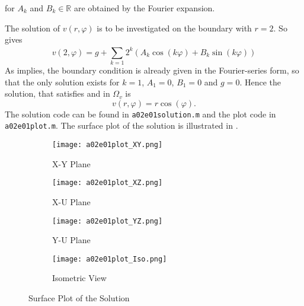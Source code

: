 for $A_k$ and $B_k \in \mathbb{R}$ are obtained by the Fourier expansion.
\par
The solution of $v(r, \varphi)$ is to be investigated on the boundary with $r = 2$.
So gives
\begin{equation}
	\label{eq:vBoundary}
	v(2, \varphi) = g + \sum_{k=1}^{} 2^k \left( A_k \cos{(k \varphi)} + B_k \sin(k \varphi)\right)
\end{equation}
As  implies, the boundary condition is already given in the Fourier-series form, so that the only solution exists for $k = 1$, $A_1 = 0$, $B_1 = 0$ and $g=0$.
Hence the solution, that satisfies  and  in $\Omega_v$ is
\begin{equation}
	\label{eq:vSol}
	v(r, \varphi) = r \cos{(\varphi)}
	\text{.}
\end{equation}
%
The solution code can be found in \texttt{a02e01solution.m} and the plot code in \texttt{a02e01plot.m}.
The surface plot of the  solution is illustrated in .
\begin{figure}[H]
\vspace*{\FigUpperVSpace}
\def\MeshFigWidth{220pt}
	\begin{subfigure}{0.5\hsize}
		\centering
		\texttt{[image: a02e01plot\_XY.png]} 
		\caption{X-Y Plane}
		\label{fig:a02e01plot_XY}
	\end{subfigure}
	\begin{subfigure}{0.5\hsize}
		\centering
		\texttt{[image: a02e01plot\_XZ.png]} 
		\caption{X-U Plane}
		\label{fig:a02e01plot_XZ}
	\end{subfigure}
	\vfill
	\begin{subfigure}{0.5\hsize}
		\centering
		\texttt{[image: a02e01plot\_YZ.png]} 
		\caption{Y-U Plane}
		\label{fig:a02e01plot_YZ}
	\end{subfigure}
	\begin{subfigure}{0.5\hsize}
		\centering
		\texttt{[image: a02e01plot\_Iso.png]} 
		\caption{Isometric View}
		\label{fig:a02e01plot_Iso}
	\end{subfigure}
	\caption{Surface Plot of the Solution}
	\label{fig:a02e01plot}
\end{figure}

%

%

%
